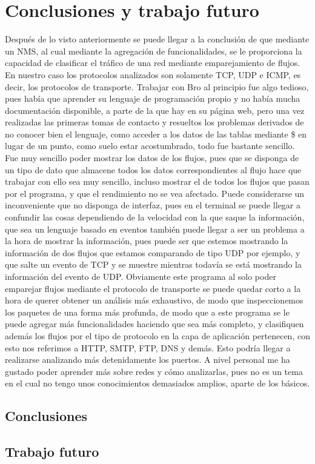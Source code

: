\chapter{Conclusiones y trabajo futuro}

Después de lo visto anteriormente se puede llegar a 
la conclusión de que mediante un NMS, al cual mediante 
la agregación de funcionalidades, se le proporciona la 
capacidad de clasificar el tráfico de una red mediante 
emparejamiento de flujos. En nuestro caso los protocolos 
analizados son solamente TCP, UDP e ICMP, es decir, 
los protocolos de transporte.
\intro
Trabajar con Bro al principio fue algo tedioso, pues 
había que aprender su lenguaje de programación propio 
y no había mucha documentación disponible, a parte de 
la que hay en su página web, pero una vez realizadas 
las primeras tomas de contacto y resueltos los problemas 
derivados de no conocer bien el lenguaje, como acceder a 
los datos de las tablas mediante \$ en lugar de un punto, 
como suelo estar acostumbrado, todo fue bastante sencillo.
\intro
Fue muy sencillo poder mostrar los datos de los flujos, 
pues que se disponga de un tipo de dato que almacene todos 
los datos correspondientes al flujo hace que trabajar con 
ello sea muy sencillo, incluso mostrar el de todos los 
flujos que pasan por el programa, y que el rendimiento 
no se vea afectado. Puede considerarse un inconveniente 
que no disponga de interfaz, pues en el terminal se puede 
llegar a confundir las cosas dependiendo de la velocidad 
con la que saque la información, que sea un lenguaje basado 
en eventos también puede llegar a ser un problema a la hora 
de mostrar la información, pues puede ser que estemos 
mostrando la información de dos flujos que estamos comparando 
de tipo UDP por ejemplo, y que salte un evento de TCP y 
se muestre mientras todavía se está mostrando la información 
del evento de UDP.
\intro
Obviamente este programa al solo poder emparejar flujos 
mediante el protocolo de transporte se puede quedar corto 
a la hora de querer obtener un análisis más exhaustivo, de 
modo que inspeccionemos los paquetes de una forma más profunda, 
de modo que a este programa se le puede agregar más funcionalidades 
haciendo que sea más completo, y clasifiquen además los flujos 
por el tipo de protocolo en la capa de aplicación pertenecen, 
con esto nos referimos a HTTP, SMTP, FTP, DNS y demás. Esto 
podría llegar a realizarse analizando más detenidamente los puertos.
\intro
A nivel personal me ha gustado poder aprender más sobre redes y 
cómo analizarlas, pues no es un tema en el cual no tengo unos 
conocimientos demasiados amplios, aparte de los básicos.

\section{Conclusiones}

\section{Trabajo futuro}
